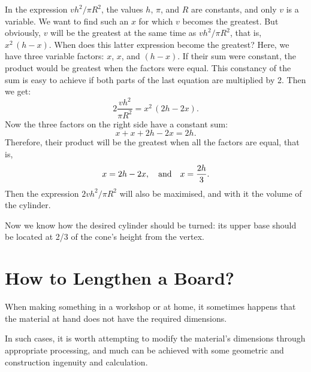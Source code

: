 In the expression \( vh^{2}/\pi R^{2}\), the values \(h\), \( \pi \), and \(R \) are constants, and only \(v \) is a variable. We want to find such an \(x \) for which \(v \) becomes the greatest. But obviously, \(v \) will be the greatest at the same time as \(vh^{2}/\pi R^{2}\), that is, \(x^{2} \, (h - x)\). When does this latter expression become the greatest? Here, we have three variable factors: \(x\), \(x\), and \((h - x)\). If their sum were constant, the product would be greatest when the factors were equal. This constancy of the sum is easy to achieve if both parts of the last equation are multiplied by 2. Then we get:
\begin{equation*}%
2 \frac{vh^{2}}{\pi R^{2}} = x^{2} \,(2h - 2x).
\end{equation*}
Now the three factors on the right side have a constant sum:
\begin{equation*}%
x + x + 2h - 2x = 2h.
\end{equation*}
Therefore, their product will be the greatest when all the factors are equal, that is,
\begin{equation*}%
x = 2h - 2x, \qand x = \frac{2h}{3}.
\end{equation*}
Then the expression \(2vh^2/\pi R^{2}\) will also be maximised, and with it the volume of the cylinder.

Now we know how the desired cylinder should be turned: its upper base should be located at 2/3 of the cone's height from the vertex.


\section{How to Lengthen a Board?}
\label{sec-12.15}

When making something in a workshop or at home, it sometimes happens that the material at hand does not have the required dimensions.

In such cases, it is worth attempting to modify the material's dimensions through appropriate processing, and much can be achieved with some geometric and construction ingenuity and calculation.


